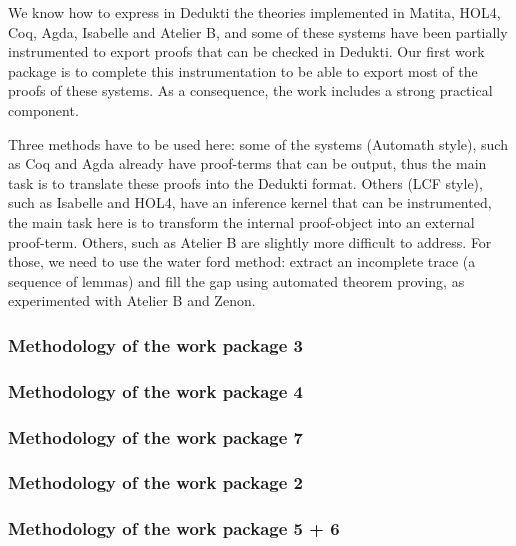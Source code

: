 We know how to express in Dedukti the theories implemented in Matita,
HOL4, Coq, Agda, Isabelle and Atelier B, and some of these systems
have been partially instrumented to export proofs that can be checked
in Dedukti. Our first work package is to complete this instrumentation
to be able to export most of the proofs of these systems. As a
consequence, the work includes a strong practical component.

Three methods have to be used here: some of the systems (Automath
style), such as Coq and Agda already have proof-terms that can be
output, thus the main task is to translate these proofs into the
Dedukti format. Others (LCF style), such as Isabelle and HOL4, have an
inference kernel that can be instrumented, the main task here is to
transform the internal proof-object into an external
proof-term. Others, such as Atelier B are slightly more difficult to
address. For those, we need to use the water ford method: extract an
incomplete trace (a sequence of lemmas) and fill the gap using
automated theorem proving, as experimented with Atelier B and Zenon.


\subsubsection{Methodology of the work package 3}

\subsubsection{Methodology of the work package 4}

\subsubsection{Methodology of the work package 7}

\subsubsection{Methodology of the work package 2}

\subsubsection{Methodology of the work package 5 + 6}


